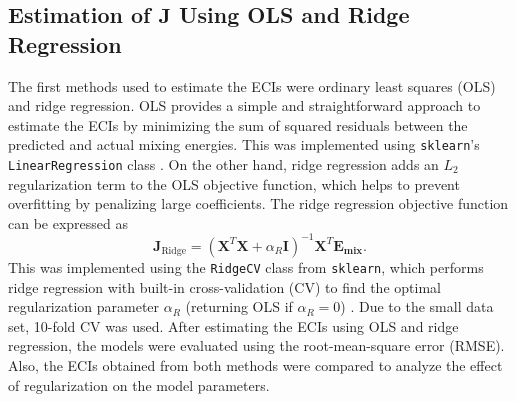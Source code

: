 \documentclass[a4paper, 12pt]{article}
\begin{document}
\subsection{Estimation of \texorpdfstring{$\bm{J}$}{J} Using OLS and Ridge Regression}
The first methods used to estimate the ECIs were ordinary least squares (OLS) and ridge regression. OLS provides a simple and straightforward approach to estimate the ECIs by minimizing the sum of squared residuals between the predicted and actual mixing energies. %
This was implemented using \texttt{sklearn}'s \texttt{LinearRegression} class \cite{scikit-learn}. On the other hand, ridge regression adds an $L_2$ regularization term to the OLS objective function, which helps to prevent overfitting by penalizing large coefficients. The ridge regression objective function can be expressed as
\begin{equation} \label{eq:ridge}
  \bm{J}_{\text{Ridge}} = \left ( \bm{X}^T \bm{X} + \alpha_R \bm{I} \right )^{-1} \bm{X}^T \bm{E_\text{mix}}.
\end{equation}
This was implemented using the \texttt{RidgeCV} class from \texttt{sklearn}, which performs ridge regression with built-in cross-validation (CV) to find the optimal regularization parameter $\alpha_R$ (returning OLS if $\alpha_R=0$) \cite{scikit-learn}. %
Due to the small data set, 10-fold CV was used. %
After estimating the ECIs using OLS and ridge regression, the models were evaluated using the root-mean-square error (RMSE). Also, the ECIs obtained from both methods were compared to analyze the effect of regularization on the model parameters.
\end{document}
